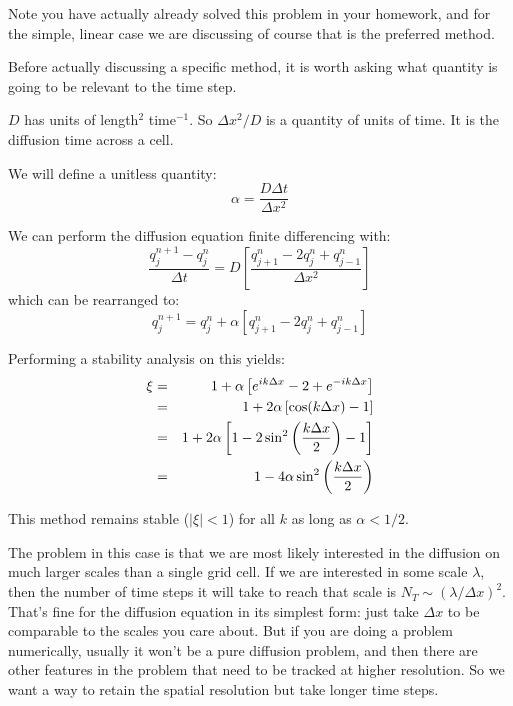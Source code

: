 Note you have actually already solved this problem in your homework,
and for the simple, linear case we are discussing of course that is
the preferred method.

Before actually discussing a specific method, it is worth asking what
quantity is going to be relevant to the time step.


\begin{answer}
$D$ has units of length$^2$ time$^{-1}$. So $\Delta x^2 / D$ is a
quantity of units of time. It is the diffusion time across a cell. 
\end{answer}

We will define a unitless quantity:
\begin{equation}
\alpha = \frac{D \Delta t}{\Delta x^2}
\end{equation}

We can perform the diffusion equation finite differencing with:
\begin{equation}
\frac{q_j^{n+1} - q_j^{n}}{\Delta t} = D \left[\frac{q_{j+1}^n - 2
q_j^n + q_{j-1}^n}{\Delta x^2}\right]
\end{equation}
which can be rearranged to:
\begin{equation}
q_j^{n+1} = q_j^{n} + \alpha \left[q_{j+1}^n - 2
q_j^n + q_{j-1}^n\right]
\end{equation}

Performing a stability analysis on this yields:
\begin{eqnarray}
\xi &=& 1 + \alpha \left[e^{ik\Delta x} - 2 + e^{-ik \Delta
x}\right] \cr
&=& 1 + 2 \alpha \left[\cos(k\Delta x) - 1 \right] \cr
&=& 1 + 2 \alpha \left[1 - 2\sin^2\left(\frac{k\Delta x}{2}\right) - 1 \right] \cr
&=& 1 - 4 \alpha \sin^2\left(\frac{k\Delta x}{2}\right) 
\end{eqnarray}


\begin{answer}
This method remains stable ($|\xi|<1$) for all $k$ as long as $\alpha
< 1/2$.
\end{answer}

The problem in this case is that we are most likely interested in the
diffusion on much larger scales than a single grid cell. If we are
interested in some scale $\lambda$, then the number of time steps it
will take to reach that scale is $N_T \sim (\lambda / \Delta
x)^2$. That's fine for the diffusion equation in its simplest form:
just take $\Delta x$ to be comparable to the scales you care
about. But if you are doing a problem numerically, usually it won't be
a pure diffusion problem, and then there are other features in the
problem that need to be tracked at higher resolution. So we want a way
to retain the spatial resolution but take longer time steps.

